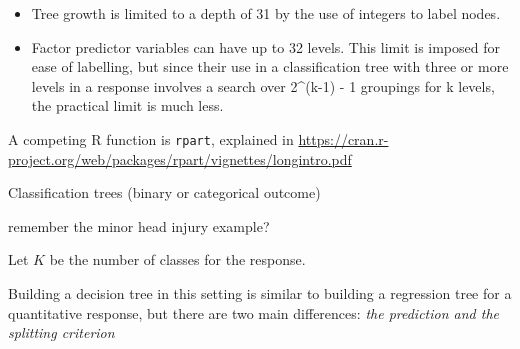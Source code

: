 \documentclass[10pt,ignorenonframetext,]{beamer}
\providecommand{\tightlist}{%
  \setlength{\itemsep}{0pt}\setlength{\parskip}{0pt}}
\begin{document}
\begin{frame}[fragile]

\begin{itemize}
\tightlist
\item
  Tree growth is limited to a depth of 31 by the use of integers to
  label nodes.
\item
  Factor predictor variables can have up to 32 levels. This limit is
  imposed for ease of labelling, but since their use in a classification
  tree with three or more levels in a response involves a search over
  2\^{}(k-1) - 1 groupings for k levels, the practical limit is much
  less.
\end{itemize}

A competing R function is \texttt{rpart}, explained in
\url{https://cran.r-project.org/web/packages/rpart/vignettes/longintro.pdf}

\end{frame}

\begin{frame}

\begin{block}{Classification trees (binary or categorical outcome)}

remember the minor head injury example?

Let \(K\) be the number of classes for the response.

Building a decision tree in this setting is similar to building a
regression tree for a quantitative response, but there are two main
differences: \emph{the prediction and the splitting criterion}

\end{block}

\end{frame}
\end{document}
